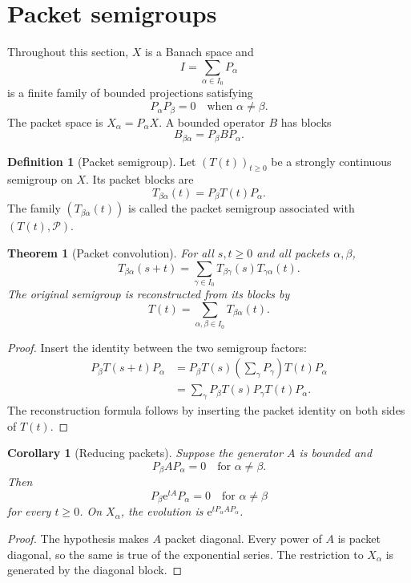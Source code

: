 \documentclass{aomart}
\newtheorem{theorem}{Theorem}[section]
\newtheorem{corollary}[corollary]{Corollary}
\theoremstyle{definition}
\newtheorem{definition}[definition]{Definition}
\theoremstyle{remark}
\newcommand{\Pcal}{\mathcal P}
\newcommand{\e}{\mathrm e}
\begin{document}
\section{Packet semigroups}\label{sec:packet_semigroups}

Throughout this section, \(X\) is a Banach space and
\[
I=\sum_{\alpha\in I_0}P_\alpha
\]
is a finite family of bounded projections satisfying
\[
P_\alpha P_\beta=0
\quad\text{when }\alpha\neq\beta.
\]
The packet space is \(X_\alpha=P_\alpha X\). A bounded operator \(B\) has blocks
\[
B_{\beta\alpha}=P_\beta BP_\alpha.
\]

\begin{definition}[Packet semigroup]\label{def:packet_semigroup}
Let \((T(t))_{t\geq0}\) be a strongly continuous semigroup on \(X\). Its packet blocks are
\[
T_{\beta\alpha}(t)=P_\beta T(t)P_\alpha.
\]
The family \((T_{\beta\alpha}(t))\) is called the packet semigroup associated with \((T(t),\Pcal)\).
\end{definition}

\begin{theorem}[Packet convolution]\label{thm:packet_convolution}
For all \(s,t\geq0\) and all packets \(\alpha,\beta\),
\[
\boxed{
T_{\beta\alpha}(s+t)
=
\sum_{\gamma\in I_0}
T_{\beta\gamma}(s)T_{\gamma\alpha}(t).
}
\]
The original semigroup is reconstructed from its blocks by
\[
T(t)=\sum_{\alpha,\beta\in I_0}T_{\beta\alpha}(t).
\]
\end{theorem}

\begin{proof}
Insert the identity between the two semigroup factors:
\[
\begin{aligned}
P_\beta T(s+t)P_\alpha
&=P_\beta T(s)\left(\sum_\gamma P_\gamma\right)T(t)P_\alpha\\
&=\sum_\gamma
P_\beta T(s)P_\gamma T(t)P_\alpha.
\end{aligned}
\]
The reconstruction formula follows by inserting the packet identity on both sides of \(T(t)\).
\end{proof}

\begin{corollary}[Reducing packets]\label{cor:reducing_packets}
Suppose the generator \(A\) is bounded and
\[
P_\beta AP_\alpha=0
\quad\text{for }\alpha\neq\beta.
\]
Then
\[
P_\beta \e^{tA}P_\alpha=0
\quad\text{for }\alpha\neq\beta
\]
for every \(t\geq0\). On \(X_\alpha\), the evolution is \(\e^{tP_\alpha AP_\alpha}\).
\end{corollary}

\begin{proof}
The hypothesis makes \(A\) packet diagonal. Every power of \(A\) is packet diagonal, so the same is true of the exponential series. The restriction to \(X_\alpha\) is generated by the diagonal block.
\end{proof}
\end{document}
